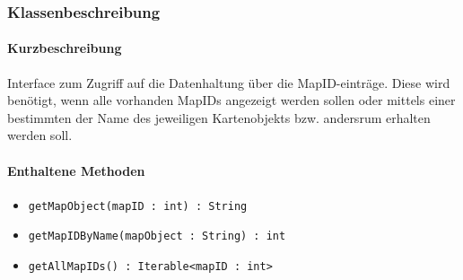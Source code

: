 \subsubsection*{Klassenbeschreibung}%
\paragraph*{Kurzbeschreibung}
Interface zum Zugriff auf die Datenhaltung über die MapID-einträge. Diese wird benötigt, wenn alle vorhanden MapIDs angezeigt werden sollen oder
mittels einer bestimmten der Name des jeweiligen Kartenobjekts bzw. andersrum erhalten werden soll.

\paragraph*{Enthaltene Methoden}
\begin{itemize}
    \item \texttt{getMapObject(mapID : int) : String}
    \item \texttt{getMapIDByName(mapObject : String) : int}
    \item \texttt{getAllMapIDs() : Iterable<mapID : int>}
\end{itemize}
